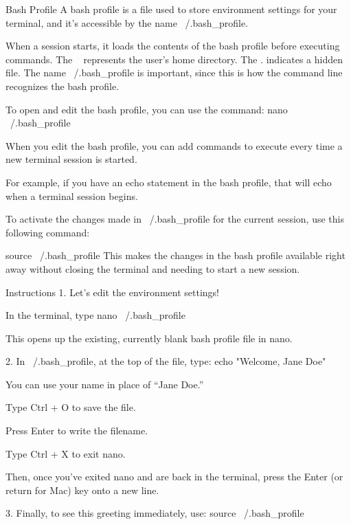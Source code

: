 Bash Profile
    A bash profile is a file used to store environment settings for your terminal, and it’s accessible by the name ~/.bash_profile.

    When a session starts, it loads the contents of the bash profile before executing commands.
        The ~ represents the user’s home directory.
        The . indicates a hidden file.
        The name ~/.bash_profile is important, since this is how the command line recognizes the bash profile.

    To open and edit the bash profile, you can use the command:
        nano ~/.bash_profile
    
    When you edit the bash profile, you can add commands to execute every time a new terminal session is started.

    For example, if you have an echo statement in the bash profile, that will echo when a terminal session begins.

    To activate the changes made in ~/.bash_profile for the current session, use this following command:

    source ~/.bash_profile
    This makes the changes in the bash profile available right away without closing the terminal and needing to start a new session.

Instructions
    1.
    Let’s edit the environment settings!

    In the terminal, type
        nano ~/.bash_profile 
    
    This opens up the existing, currently blank bash profile file in nano.

    2.
    In ~/.bash_profile, at the top of the file, type:
        echo "Welcome, Jane Doe" 

    You can use your name in place of “Jane Doe.”

    Type Ctrl + O to save the file.

    Press Enter to write the filename.

    Type Ctrl + X to exit nano.

    Then, once you’ve exited nano and are back in the terminal, press the Enter (or return for Mac) key onto a new line.

    3.
    Finally, to see this greeting immediately, use:
        source ~/.bash_profile 